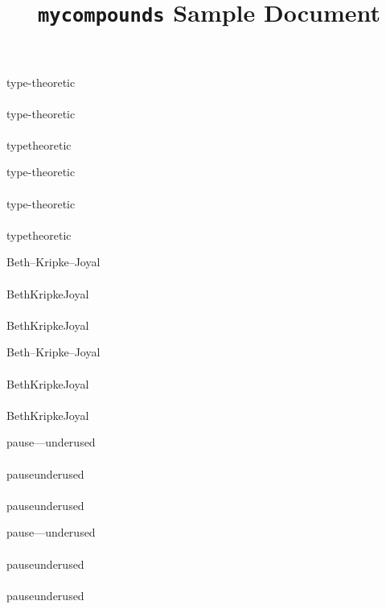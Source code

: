 \documentclass{article}
\begin{document}
\title{\texttt{mycompounds} Sample Document}
\author{}
\date{}

\maketitle

\begin{verbatim*}
\usepackage{mycompounds}
\end{verbatim*}

\begin{verbatim*}
\begin{minipage}{0pt}
type-theoretic\\\\
type\hyp{}theoretic\\\\
type\nbhyp{}theoretic\\
\end{minipage}
\end{verbatim*}
%
\begin{minipage}{0pt}
  type-theoretic\\\\
  type\hyp{}theoretic\\\\
  type\nbhyp{}theoretic\\
\end{minipage}

\begin{verbatim*}
\begin{minipage}{0pt}
Beth--Kripke--Joyal\\\\
Beth\ndash{}Kripke\ndash{}Joyal\\\\
Beth\nbndash{}Kripke\nbndash{}Joyal\\
\end{minipage}
\end{verbatim*}
%
\begin{minipage}{0pt}
  Beth--Kripke--Joyal\\\\
  Beth\ndash{}Kripke\ndash{}Joyal\\\\
  Beth\nbndash{}Kripke\nbndash{}Joyal\\
\end{minipage}

\begin{verbatim*}
\begin{minipage}{0pt}
pause---underused\\\\
pause\mdash{}underused\\\\
pause\nbmdash{}underused\\
\end{minipage}
\end{verbatim*}
%
\begin{minipage}{0pt}
  pause---underused\\\\
  pause\mdash{}underused\\\\
  pause\nbmdash{}underused\\
\end{minipage}
\end{document}
